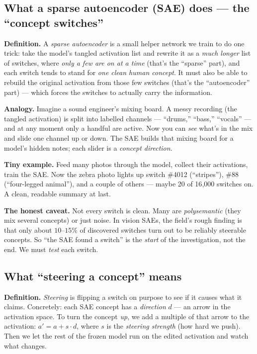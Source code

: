 \documentclass[12pt]{article}
\newcommand{\dlabel}[1]{\textbf{\textcolor{accent}{#1}}\;}
\newcommand{\onm}[1]{\textcolor{onman}{#1}}
\begin{document}
\subsection{What a sparse autoencoder (SAE) does --- the ``concept switches''}

\dlabel{Definition.} A \emph{sparse autoencoder} is a small helper network we train to do one trick: take the model's tangled activation list and rewrite it as a \emph{much longer} list of switches, where \emph{only a few are on at a time} (that's the ``sparse'' part), and each switch tends to stand for \emph{one clean human concept}. It must also be able to rebuild the original activation from those few switches (that's the ``autoencoder'' part) --- which forces the switches to actually carry the information.

\dlabel{Analogy.} Imagine a sound engineer's mixing board. A messy recording (the tangled activation) is split into labelled channels --- ``drums,'' ``bass,'' ``vocals'' --- and at any moment only a handful are active. Now you can \emph{see} what's in the mix and slide one channel up or down. The SAE builds that mixing board for a model's hidden notes; each slider is a \emph{concept direction}.

\dlabel{Tiny example.} Feed many photos through the model, collect their activations, train the SAE. Now the zebra photo lights up switch \#4012 (``stripes''), \#88 (``four-legged animal''), and a couple of others --- maybe 20 of 16{,}000 switches on. A clean, readable summary at last.

\dlabel{The honest caveat.} Not every switch is clean. Many are \emph{polysemantic} (they mix several concepts) or just noise. In vision SAEs, the field's rough finding is that only about \onm{$10$--$15\%$} of discovered switches turn out to be reliably steerable concepts. So ``the SAE found a switch'' is the \emph{start} of the investigation, not the end. We must \emph{test} each switch.

\subsection{What ``steering a concept'' means}

\dlabel{Definition.} \emph{Steering} is flipping a switch on purpose to see if it causes what it claims. Concretely: each SAE concept has a \emph{direction} $d$ --- an arrow in the activation space. To turn the concept \emph{up}, we add a multiple of that arrow to the activation: $a' = a + s\cdot d$, where $s$ is the \emph{steering strength} (how hard we push). Then we let the rest of the frozen model run on the edited activation and watch what changes.
\end{document}
